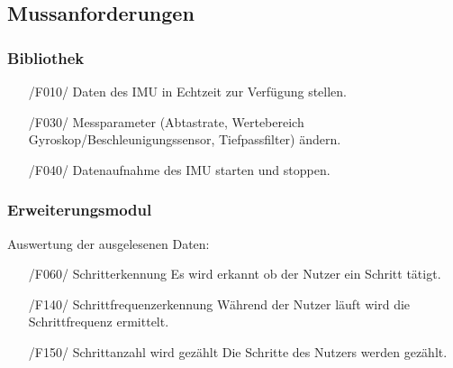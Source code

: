 \documentclass[a4paper,12pt]{article}
\begin{document}
  \subsection{Mussanforderungen}
    \subsubsection{Bibliothek}
    \begin{itemize}
      \item[/F010/] Daten des \Gls{IMU} in \Gls{Echtzeit} zur Verfügung stellen.
      \item[/F030/] Messparameter (Abtastrate, Wertebereich Gyroskop/Beschleunigungssensor, Tiefpassfilter) ändern. 
      \item[/F040/] Datenaufnahme des \Gls{IMU} starten und stoppen.
    \end{itemize}
    \subsubsection{Erweiterungsmodul}
     Auswertung der ausgelesenen Daten:
     \begin{itemize}
      \item[/F060/] \textsf{Schritterkennung} Es wird erkannt ob der Nutzer ein Schritt tätigt.
      \item[/F140/] \textsf{Schrittfrequenzerkennung} Während der Nutzer läuft wird die Schrittfrequenz ermittelt.
      \item[/F150/] \textsf{Schrittanzahl wird gezählt} Die Schritte des Nutzers werden gezählt.
    \end{itemize}
\end{document}
